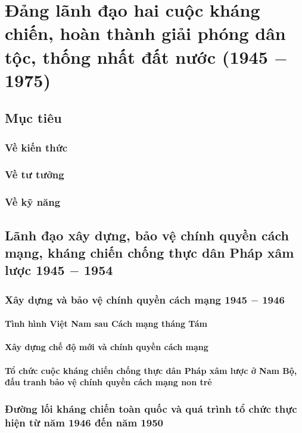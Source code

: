 \chapter{Đảng lãnh đạo hai cuộc kháng chiến, hoàn thành giải phóng dân tộc, thống nhất đất nước (1945 $-$ 1975)}
\section*{Mục tiêu}
\subsection*{Về kiến thức}
\subsection*{Về tư tưởng}
\subsection*{Về kỹ năng}

\section{Lãnh đạo xây dựng, bảo vệ chính quyền cách mạng, kháng chiến chống thực dân Pháp xâm lược 1945 $-$ 1954}

\subsection{Xây dựng và bảo vệ chính quyền cách mạng 1945 $-$ 1946}
\subsubsection{Tình hình Việt Nam sau Cách mạng tháng Tám}
\subsubsection{Xây dựng chế độ mới và chính quyền cách mạng}
\subsubsection{Tổ chức cuộc kháng chiến chống thực dân Pháp xâm lược ở Nam Bộ, đấu tranh bảo vệ chính quyền cách mạng non trẻ}

\subsection{Đường lối kháng chiến toàn quốc và quá trình tổ chức thực hiện từ năm 1946 đến năm 1950}
